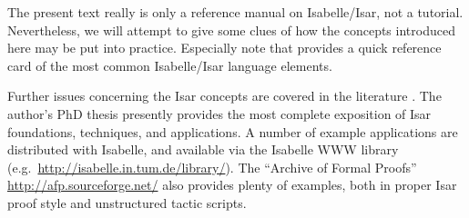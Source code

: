 \begin{isabellebody}
\begin{isamarkuptext}
  \medskip The present text really is only a reference manual on
  Isabelle/Isar, not a tutorial.  Nevertheless, we will attempt to
  give some clues of how the concepts introduced here may be put into
  practice.  Especially note that  provides a quick
  reference card of the most common Isabelle/Isar language elements.

  Further issues concerning the Isar concepts are covered in the
  literature
  \cite{Wenzel:1999:TPHOL,Wiedijk:2000:MV,Bauer-Wenzel:2000:HB,Bauer-Wenzel:2001}.
  The author's PhD thesis \cite{Wenzel-PhD} presently provides the
  most complete exposition of Isar foundations, techniques, and
  applications.  A number of example applications are distributed with
  Isabelle, and available via the Isabelle WWW library (e.g.\
  \url{http://isabelle.in.tum.de/library/}).  The ``Archive of Formal
  Proofs'' \url{http://afp.sourceforge.net/} also provides plenty of
  examples, both in proper Isar proof style and unstructured tactic
  scripts.%
\end{isamarkuptext}%
\isamarkuptrue%
%
\isadelimtheory
%
\endisadelimtheory
%
\isatagtheory
{}\isamarkupfalse%
%
\endisatagtheory
{\isafoldtheory}%
%
\isadelimtheory
%
\endisadelimtheory
\isanewline
\end{isabellebody}%
